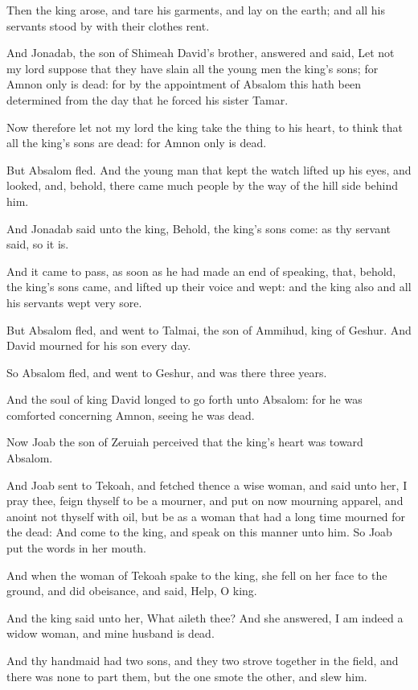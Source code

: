 \Verse Then the king arose, and tare his garments, and lay on the earth; and all his servants stood by with their clothes rent.

\Verse And Jonadab, the son of Shimeah David's brother, answered and said, Let not my lord suppose that they have slain all the young men the king's sons; for Amnon only is dead: for by the appointment of Absalom this hath been determined from the day that he forced his sister Tamar.

\Verse Now therefore let not my lord the king take the thing to his heart, to think that all the king's sons are dead: for Amnon only is dead.

\Verse But Absalom fled. And the young man that kept the watch lifted up his eyes, and looked, and, behold, there came much people by the way of the hill side behind him.

\Verse And Jonadab said unto the king, Behold, the king's sons come: as thy servant said, so it is.

\Verse And it came to pass, as soon as he had made an end of speaking, that, behold, the king's sons came, and lifted up their voice and wept: and the king also and all his servants wept very sore.

\Verse But Absalom fled, and went to Talmai, the son of Ammihud, king of Geshur. And David mourned for his son every day.

\Verse So Absalom fled, and went to Geshur, and was there three years.

\Verse And the soul of king David longed to go forth unto Absalom: for he was comforted concerning Amnon, seeing he was dead.


\Chapter
\Verse Now Joab the son of Zeruiah perceived that the king's heart was toward Absalom.

\Verse And Joab sent to Tekoah, and fetched thence a wise woman, and said unto her, I pray thee, feign thyself to be a mourner, and put on now mourning apparel, and anoint not thyself with oil, but be as a woman that had a long time mourned for the dead: \Verse And come to the king, and speak on this manner unto him. So Joab put the words in her mouth.

\Verse And when the woman of Tekoah spake to the king, she fell on her face to the ground, and did obeisance, and said, Help, O king.

\Verse And the king said unto her, What aileth thee? And she answered, I am indeed a widow woman, and mine husband is dead.

\Verse And thy handmaid had two sons, and they two strove together in the field, and there was none to part them, but the one smote the other, and slew him.

